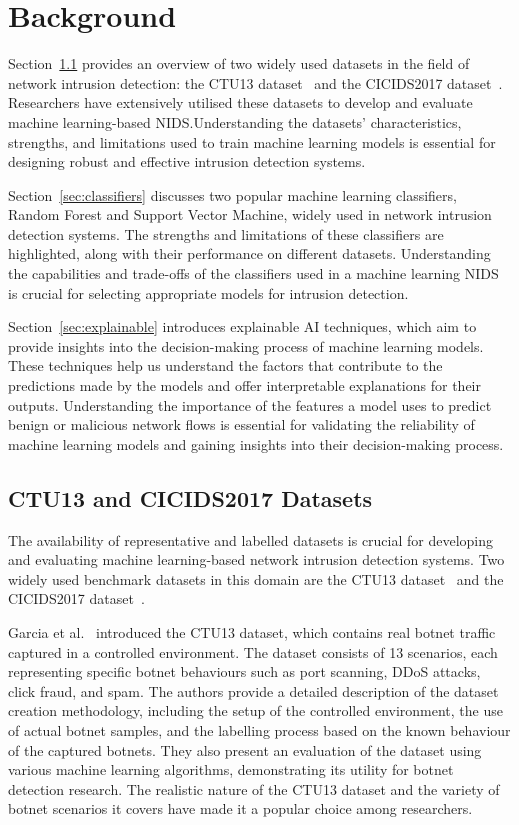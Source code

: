 \chapter{Background}

Section~\ref{sec:datasets} provides an overview of two widely used datasets in the field of network intrusion detection: the CTU13 dataset~\cite{garcia2014empirical} and the CICIDS2017 dataset~\cite{sharafaldin2018toward}. Researchers have extensively utilised these datasets to develop and evaluate machine learning-based NIDS.\@ Understanding the datasets' characteristics, strengths, and limitations used to train machine learning models is essential for designing robust and effective intrusion detection systems.

Section~\ref{sec:classifiers} discusses two popular machine learning classifiers, Random Forest and Support Vector Machine, widely used in network intrusion detection systems. The strengths and limitations of these classifiers are highlighted, along with their performance on different datasets. Understanding the capabilities and trade-offs of the classifiers used in a machine learning NIDS is crucial for selecting appropriate models for intrusion detection.

Section~\ref{sec:explainable} introduces explainable AI techniques, which aim to provide insights into the decision-making process of machine learning models. These techniques help us understand the factors that contribute to the predictions made by the models and offer interpretable explanations for their outputs. Understanding the importance of the features a model uses to predict benign or malicious network flows is essential for validating the reliability of machine learning models and gaining insights into their decision-making process.

\section{CTU13 and CICIDS2017 Datasets}\label{sec:datasets}

The availability of representative and labelled datasets is crucial for developing and evaluating machine learning-based network intrusion detection systems. Two widely used benchmark datasets in this domain are the CTU13 dataset~\cite{garcia2014empirical} and the CICIDS2017 dataset~\cite{sharafaldin2018toward}.

Garcia et al.~\cite{garcia2014empirical} introduced the CTU13 dataset, which contains real botnet traffic captured in a controlled environment. The dataset consists of 13 scenarios, each representing specific botnet behaviours such as port scanning, DDoS attacks, click fraud, and spam. The authors provide a detailed description of the dataset creation methodology, including the setup of the controlled environment, the use of actual botnet samples, and the labelling process based on the known behaviour of the captured botnets. They also present an evaluation of the dataset using various machine learning algorithms, demonstrating its utility for botnet detection research. The realistic nature of the CTU13 dataset and the variety of botnet scenarios it covers have made it a popular choice among researchers.

